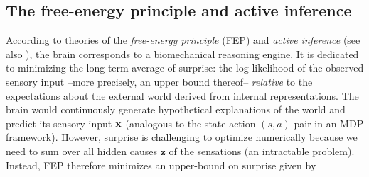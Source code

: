\documentclass[10pt,letterpaper]{article}
\def\z{\mathbf{z}}
\def\x{\mathbf{x}}
\begin{document}
\subsection{The free-energy principle and active inference}
According to theories of the \textit{free-energy principle} (FEP) and
\textit{active inference} \citep{friston2010free, fristonAIorRL} (see also \citep{dayan1995helmholtz}),
the brain corresponds to
a biomechanical reasoning engine. It is
dedicated to minimizing the long-term average of surprise: the log-likelihood of the observed sensory input --more precisely, an upper bound thereof-- \textit{relative} to the expectations about the external world derived from internal representations. The brain
would continuously generate hypothetical explanations of the world
and predict its sensory input $\bf{x}$ (analogous to the state-action $(s, a)$ pair in an MDP
framework).
However, surprise is challenging to optimize numerically
because we need to sum over all hidden causes $\z$ of the sensations (an intractable problem).
Instead, FEP therefore minimizes an upper-bound on surprise given by
\end{document}
